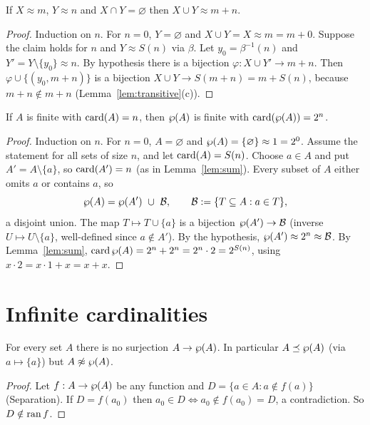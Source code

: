 \begin{lemma}\label{lem:sum}
	If $X\approx m$, $Y\approx n$ and $X\cap Y=\varnothing$ then $X\cup Y\approx m+n$.
\end{lemma}
\begin{proof}
	Induction on $n$. For $n=0$, $Y=\varnothing$ and $X\cup Y=X\approx m=m+0$. Suppose the claim holds for $n$ and $Y\approx S(n)$ via $\beta$. Let $y_0=\beta^{-1}(n)$ and $Y'=Y\setminus\{y_0\}\approx n$. By hypothesis there is a bijection $\varphi:X\cup Y'\to m+n$. Then $\varphi\cup\{(y_0,m+n)\}$ is a bijection $X\cup Y\to S(m+n)=m+S(n)$, because $m+n\notin m+n$ (Lemma~\ref{lem:transitive}(c)).
\end{proof}

\begin{theorem}\label{thm:powersize}
	If $A$ is finite with $\operatorname{card}(A)=n$, then $\wp(A)$ is finite with $\operatorname{card}(\wp(A))=2^n$.
\end{theorem}
\begin{proof}
	Induction on $n$. For $n=0$, $A=\varnothing$ and $\wp(A)=\{\varnothing\}\approx1=2^0$. Assume the statement for all sets of size $n$, and let $\operatorname{card}(A)=S(n)$. Choose $a\in A$ and put $A'=A\setminus\{a\}$, so $\operatorname{card}(A')=n$ (as in Lemma~\ref{lem:sum}). Every subset of $A$ either omits $a$ or contains $a$, so
	\[
	\wp(A)=\wp(A')\ \cup\ \mathcal B,\qquad\mathcal B:=\{T\subseteq A:a\in T\},
	\]
	a disjoint union. The map $T\mapsto T\cup\{a\}$ is a bijection $\wp(A')\to\mathcal B$ (inverse $U\mapsto U\setminus\{a\}$, well-defined since $a\notin A'$). By the hypothesis, $\wp(A')\approx2^n\approx\mathcal B$. By Lemma~\ref{lem:sum}, $\operatorname{card}\wp(A)=2^n+2^n=2^n\cdot2=2^{S(n)}$, using $x\cdot2=x\cdot1+x=x+x$.
\end{proof}

\section{Infinite cardinalities}

\begin{theorem}[Cantor]\label{thm:cantor}
	For every set $A$ there is no surjection $A\to\wp(A)$. In particular $A\preceq\wp(A)$ (via $a\mapsto\{a\}$) but $A\not\approx\wp(A)$.
\end{theorem}
\begin{proof}
	Let $f:A\to\wp(A)$ be any function and $D=\{a\in A:a\notin f(a)\}$ (Separation). If $D=f(a_0)$ then $a_0\in D\iff a_0\notin f(a_0)=D$, a contradiction. So $D\notin\operatorname{ran} f$.
\end{proof}

